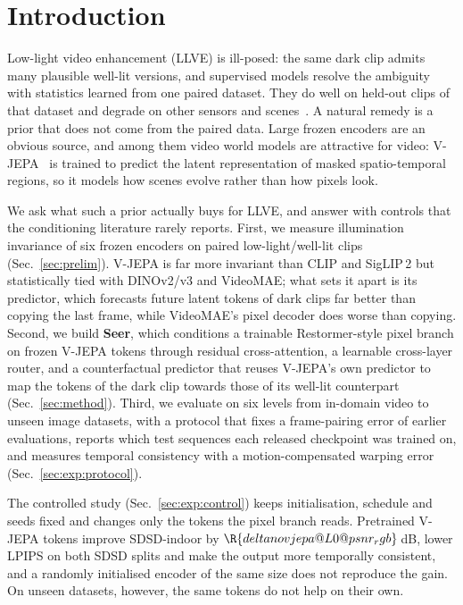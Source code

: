 \section{Introduction}\label{sec:intro}

Low-light video enhancement (LLVE) is ill-posed: the same dark clip admits many plausible well-lit versions, and supervised models resolve the ambiguity with statistics learned from one paired dataset. They do well on held-out clips of that dataset and degrade on other sensors and scenes~\citep{bvi_rlv}. A natural remedy is a prior that does not come from the paired data. Large frozen encoders are an obvious source, and among them video world models are attractive for video: V-JEPA~\citep{vjepa,vjepa2} is trained to predict the latent representation of masked spatio-temporal regions, so it models how scenes evolve rather than how pixels look.

We ask what such a prior actually buys for LLVE, and answer with controls that the conditioning literature rarely reports. First, we measure illumination invariance of six frozen encoders on paired low-light/well-lit clips (Sec.~\ref{sec:prelim}). V-JEPA is far more invariant than CLIP and SigLIP\,2 but statistically tied with DINOv2/v3 and VideoMAE; what sets it apart is its predictor, which forecasts future latent tokens of dark clips far better than copying the last frame, while VideoMAE's pixel decoder does worse than copying. Second, we build \textbf{Seer}, which conditions a trainable Restormer-style pixel branch on frozen V-JEPA tokens through residual cross-attention, a learnable cross-layer router, and a counterfactual predictor that reuses V-JEPA's own predictor to map the tokens of the dark clip towards those of its well-lit counterpart (Sec.~\ref{sec:method}). Third, we evaluate on six levels from in-domain video to unseen image datasets, with a protocol that fixes a frame-pairing error of earlier evaluations, reports which test sequences each released checkpoint was trained on, and measures temporal consistency with a motion-compensated warping error (Sec.~\ref{sec:exp:protocol}).

The controlled study (Sec.~\ref{sec:exp:control}) keeps initialisation, schedule and seeds fixed and changes only the tokens the pixel branch reads. Pretrained V-JEPA tokens improve SDSD-indoor by $\R{deltanovjepa@L0@psnr_rgb}$\,dB, lower LPIPS on both SDSD splits and make the output more temporally consistent, and a randomly initialised encoder of the same size does not reproduce the gain. On unseen datasets, however, the same tokens do not help on their own. %

